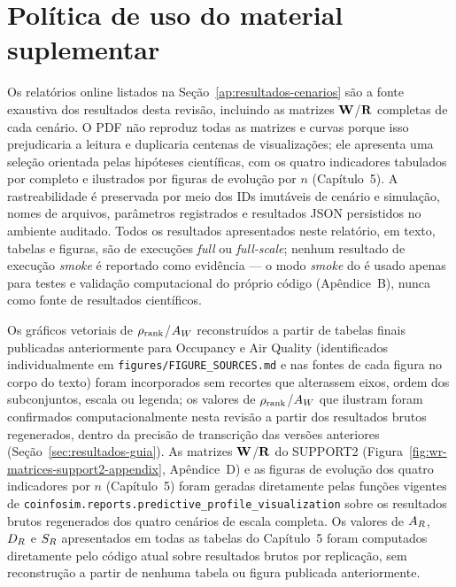 \section{Política de uso do material suplementar}

Os relatórios online listados na Seção~\ref{ap:resultados-cenarios} são a fonte exaustiva dos resultados desta revisão, incluindo as matrizes $\mathbf{W}$/$\mathbf{R}$ completas de cada cenário. O PDF não reproduz todas as matrizes e curvas porque isso prejudicaria a leitura e duplicaria centenas de visualizações; ele apresenta uma seleção orientada pelas hipóteses científicas, com os quatro indicadores tabulados por completo e ilustrados por figuras de evolução por $n$ (Capítulo~5). A rastreabilidade é preservada por meio dos IDs imutáveis de cenário e simulação, nomes de arquivos, parâmetros registrados e resultados JSON persistidos no ambiente auditado. Todos os resultados apresentados neste relatório, em texto, tabelas e figuras, são de execuções \textit{full} ou \textit{full-scale}; nenhum resultado de execução \textit{smoke} é reportado como evidência --- o modo \textit{smoke} do \CoInfoSim{} é usado apenas para testes e validação computacional do próprio código (Apêndice~B), nunca como fonte de resultados científicos.

Os gráficos vetoriais de $\rho_{\mathrm{rank}}$/$A_W$ reconstruídos a partir de tabelas finais publicadas anteriormente para Occupancy e Air Quality (identificados individualmente em \texttt{figures/FIGURE\_SOURCES.md} e nas fontes de cada figura no corpo do texto) foram incorporados sem recortes que alterassem eixos, ordem dos subconjuntos, escala ou legenda; os valores de $\rho_{\mathrm{rank}}$/$A_W$ que ilustram foram confirmados computacionalmente nesta revisão a partir dos resultados brutos regenerados, dentro da precisão de transcrição das versões anteriores (Seção~\ref{sec:resultados-guia}). As matrizes $\mathbf{W}$/$\mathbf{R}$ do SUPPORT2 (Figura~\ref{fig:wr-matrices-support2-appendix}, Apêndice~D) e as figuras de evolução dos quatro indicadores por $n$ (Capítulo~5) foram geradas diretamente pelas funções vigentes de \texttt{coinfosim.reports.predictive\_profile\_visualization} sobre os resultados brutos regenerados dos quatro cenários de escala completa. Os valores de $A_R$, $D_R$ e $S_R$ apresentados em todas as tabelas do Capítulo~5 foram computados diretamente pelo código atual sobre resultados brutos por replicação, sem reconstrução a partir de nenhuma tabela ou figura publicada anteriormente.
